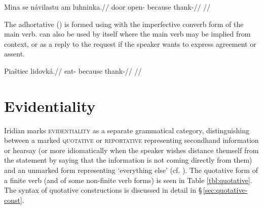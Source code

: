 \pex
\begingl
\gla Mina se návilastu am luhninka.//
\glb door \Refl{} open- because thank-//
\glft {}//
\endgl
\xe

The adhortative () is formed using  with the
imperfective converb form of the main verb.  can also be used by
itself where the main verb may be implied from context, or as a reply to the
request if the speaker wants to express agreement or assent.

\pex
\begingl
\gla Piaštiec lidovká.//
\glb eat- because thank-//
\glft {}//
\endgl
\xe

\section{Evidentiality}\label{sec:quotative}

Iridian marks {\scshape evidentiality} as a separate grammatical category,
distinguishing between a marked {\scshape quotative} or {\scshape reportative}
representing secondhand information or hearsay (or more idiomatically when the
speaker wishes distance themself from the statement by saying that the
information is not coming directly from them) and an unmarked form representing
`everything else' (cf. \cite[31-33]{aikhenvald2004}). The quotative form of a
finite verb (and of some non-finite verb forms) is seen in Table
\ref{tbl:quotative}. The syntax of quotative constructions is discussed in
detail in \S\,\ref{sec:quotative-const}.


